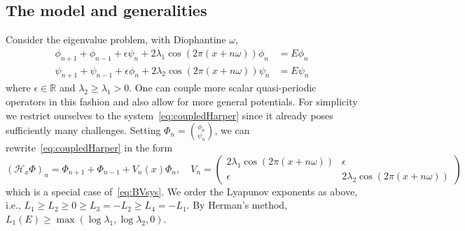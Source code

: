 \documentclass[11pt]{amsart}
\newcommand{\R}{\mathbb R}
\def\calH{\mathcal{H}}
\begin{document}
\subsection{The model and generalities}
Consider the eigenvalue problem, with Diophantine $\omega$, 
\begin{equation}
     \label{eq:coupledHarper}
     \begin{split}
          \phi_{n+1}+\phi_{n-1}+\epsilon\psi_n + 2\lambda_1 \cos(2\pi(x+n\omega)) \phi_n &= E\phi_n \\
     \psi_{n+1}+\psi_{n-1}+\epsilon\phi_n + 2\lambda_2 \cos(2\pi(x+n\omega)) \psi_n &= E\psi_n
     \end{split}
\end{equation}
where $\epsilon\in\R$ and $\lambda_2\ge \lambda_1>0$. One can couple more scalar quasi-periodic operators in this fashion and also allow for more general potentials. For simplicity we restrict ourselves to the system~\eqref{eq:coupledHarper} since it already poses sufficiently many challenges. Setting $\Phi_n=\binom{\phi_n}{\psi_n}$, we can rewrite~\eqref{eq:coupledHarper} in the form
\[
(\calH_x \Phi)_n = \Phi_{n+1}+\Phi_{n-1} + V_n(x) \Phi_n, \quad V_n = \left( \begin{matrix}
    2\lambda_1 \cos(2\pi(x+n\omega))  & \epsilon \\ \epsilon & 2\lambda_2 \cos(2\pi(x+n\omega)) 
\end{matrix}\right)
\]
which is a special case of~\eqref{eq:BVsys}. We order the Lyapunov exponents as above, i.e.,  $L_1\ge L_2 \ge0\ge L_3=-L_2\ge L_4=-L_1$. By Herman's method, $L_1(E)\ge \max(\log\lambda_1,\log\lambda_2,0)$.  
\end{document}

